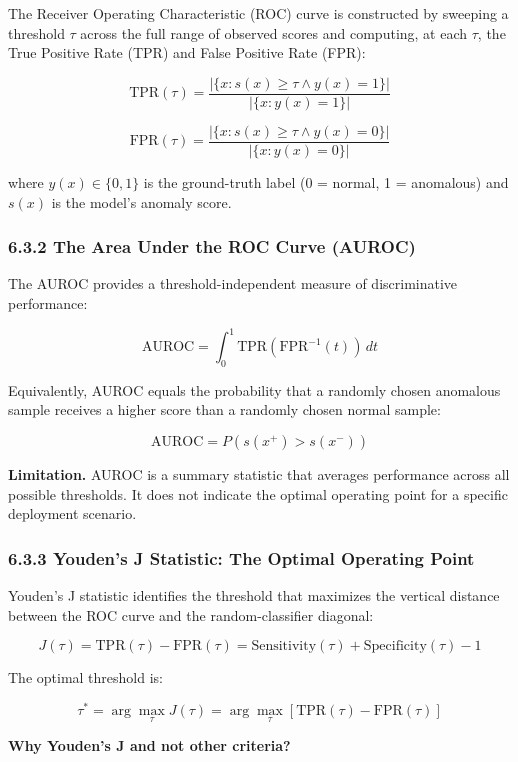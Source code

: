 \documentclass[12pt, a4paper, oneside]{report}
\begin{document}
The Receiver Operating Characteristic (ROC) curve is constructed by sweeping a threshold \(\tau\) across the full range of observed scores and computing, at each \(\tau\), the True Positive Rate (TPR) and False Positive Rate (FPR):

\[\text{TPR}(\tau) = \frac{|\{x : s(x) \geq \tau \land y(x) = 1\}|}{|\{x : y(x) = 1\}|}\]

\[\text{FPR}(\tau) = \frac{|\{x : s(x) \geq \tau \land y(x) = 0\}|}{|\{x : y(x) = 0\}|}\]

where \(y(x) \in \{0, 1\}\) is the ground-truth label (0 = normal, 1 = anomalous) and \(s(x)\) is the model's anomaly score.

\subsubsection{6.3.2 The Area Under the ROC Curve (AUROC)}\label{the-area-under-the-roc-curve-auroc}

The AUROC provides a threshold-independent measure of discriminative performance:

\[\text{AUROC} = \int_0^1 \text{TPR}(\text{FPR}^{-1}(t)) \, dt\]

Equivalently, AUROC equals the probability that a randomly chosen anomalous sample receives a higher score than a randomly chosen normal sample:

\[\text{AUROC} = P(s(x^+) > s(x^-))\]

\textbf{Limitation.} AUROC is a summary statistic that averages performance across all possible thresholds. It does not indicate the optimal operating point for a specific deployment scenario.

\subsubsection{6.3.3 Youden's J Statistic: The Optimal Operating Point}\label{youdens-j-statistic-the-optimal-operating-point}

Youden's J statistic identifies the threshold that maximizes the vertical distance between the ROC curve and the random-classifier diagonal:

\[J(\tau) = \text{TPR}(\tau) - \text{FPR}(\tau) = \text{Sensitivity}(\tau) + \text{Specificity}(\tau) - 1\]

The optimal threshold is:

\[\tau^* = \arg\max_\tau J(\tau) = \arg\max_\tau [\text{TPR}(\tau) - \text{FPR}(\tau)]\]

\textbf{Why Youden's J and not other criteria?}
\end{document}
